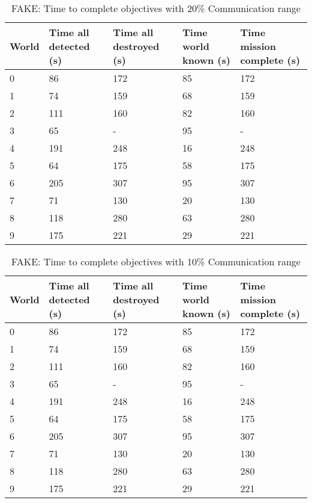 \begin{table}[h]
	\caption{FAKE: Time to complete objectives with 20\% Communication range}
	\centering
	\label{tab:comm20}
	
	\begin{tabular}{|p{1cm}|p{1.5cm}|p{1.75cm}|p{1.5cm}|p{1.5cm}|}
		\hline
		World & Time all detected (s) & Time all destroyed (s) & Time world known (s) & Time mission complete (s) \\
		\hline
		0&	 86 & \cellcolor{red}172 & 85 & 172 \\ \hline
		1&	 74 & \cellcolor{red}159 & 68 & 159 \\ \hline
		2&	111 & \cellcolor{red}160 & 82 & 160 \\ \hline
		3&	 65 & -                  & 95 &	-  \\ \hline
		4&	191 & \cellcolor{red}248 & 16 & 248 \\ \hline
		5&	 64 & \cellcolor{red}175 & 58 & 175 \\ \hline
		6&	205 & \cellcolor{red}307 & 95 & 307 \\ \hline
		7&	 71 & \cellcolor{red}130 & 20 & 130 \\ \hline
		8&	118 & \cellcolor{red}280 & 63 & 280 \\ \hline
		9&	175 & \cellcolor{red}221 & 29 & 221 \\ \hline
	\end{tabular}
\end{table}


\begin{table}[h]
	\caption{FAKE: Time to complete objectives with 10\% Communication range}
	\centering
	\label{tab:comm10}
	
	\begin{tabular}{|p{1cm}|p{1.5cm}|p{1.75cm}|p{1.5cm}|p{1.5cm}|}
		\hline
		World & Time all detected (s) & Time all destroyed (s) & Time world known (s) & Time mission complete (s) \\
		\hline
		0&	 86 & \cellcolor{red}172 & 85 & 172 \\ \hline
		1&	 74 & \cellcolor{red}159 & 68 & 159 \\ \hline
		2&	111 & \cellcolor{red}160 & 82 & 160 \\ \hline
		3&	 65 & -                  & 95 &	-  \\ \hline
		4&	191 & \cellcolor{red}248 & 16 & 248 \\ \hline
		5&	 64 & \cellcolor{red}175 & 58 & 175 \\ \hline
		6&	205 & \cellcolor{red}307 & 95 & 307 \\ \hline
		7&	 71 & \cellcolor{red}130 & 20 & 130 \\ \hline
		8&	118 & \cellcolor{red}280 & 63 & 280 \\ \hline
		9&	175 & \cellcolor{red}221 & 29 & 221 \\ \hline
	\end{tabular}
\end{table}


